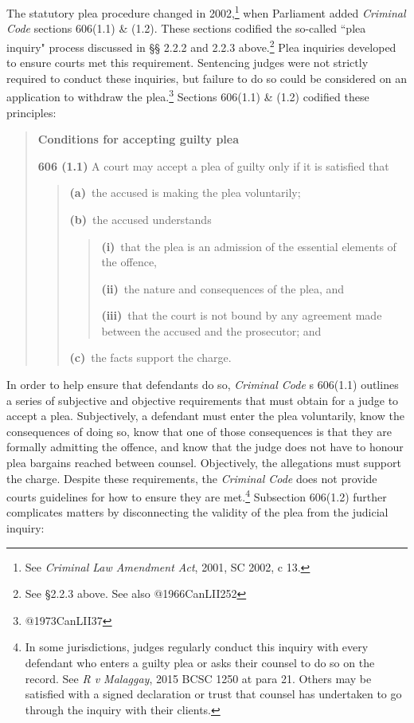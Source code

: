 The statutory plea procedure changed in 2002,\footnote{See \textit{Criminal Law Amendment Act}, 2001, SC 2002, c 13.} when Parliament added \textit{Criminal Code} sections 606(1.1) \& (1.2). These sections codified the so-called ``plea inquiry" process discussed in §§ 2.2.2 and 2.2.3 above.\footnote{See §2.2.3 above. See also @1966CanLII252} Plea inquiries developed to ensure courts met this requirement. Sentencing judges were not strictly required to conduct these inquiries, but failure to do so could be considered on an application to withdraw the plea.\footnote{@1973CanLII37} Sections 606(1.1) \& (1.2) codified these principles:

\begin{quote}
    \singlespacing
    \textbf{Conditions for accepting guilty plea}
    
    \textbf{606 (1.1)} A court may accept a plea of guilty only if it is satisfied that

    \begin{quote}
        \textbf{(a)} the accused is making the plea voluntarily;
        
        \textbf{(b)} the accused understands
        \begin{quote}
            \textbf{(i)} that the plea is an admission of the essential elements of the offence,
            
            \textbf{(ii)} the nature and consequences of the plea, and
            
            \textbf{(iii)} that the court is not bound by any agreement made between the accused and the prosecutor; and   
        \end{quote}
        \textbf{(c)} the facts support the charge.
    \end{quote}

\end{quote}

In order to help ensure that defendants do so, \textit{Criminal Code} s 606(1.1) outlines a series of subjective and objective requirements that must obtain for a judge to accept a plea. Subjectively, a defendant must enter the plea voluntarily, know the consequences of doing so, know that one of those consequences is that they are formally admitting the offence, and know that the judge does not have to honour plea bargains reached between counsel. Objectively, the allegations must support the charge. Despite these requirements, the \textit{Criminal Code} does not provide courts guidelines for how to ensure they are met.\footnote{In some jurisdictions, judges regularly conduct this inquiry with every defendant who enters a guilty plea or asks their counsel to do so on the record. See \textit{R v Malaggay}, 2015 BCSC 1250 at para 21. Others may be satisfied with a signed declaration or trust that counsel has undertaken to go through the inquiry with their clients.} Subsection 606(1.2) further complicates matters by disconnecting the validity of the plea from the judicial inquiry:

